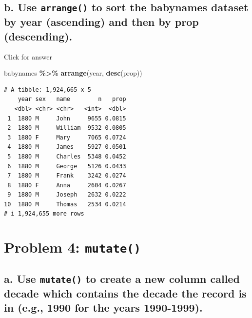 \documentclass[
]{book}
\newenvironment{Shaded}{\begin{snugshade}}{\end{snugshade}}
\newcommand{\FunctionTok}[1]{\textcolor[rgb]{0.13,0.29,0.53}{\textbf{#1}}}
\newcommand{\NormalTok}[1]{#1}
\newcommand{\SpecialCharTok}[1]{\textcolor[rgb]{0.81,0.36,0.00}{\textbf{#1}}}
\begin{document}
\hypertarget{b.-use-arrange-to-sort-the-babynames-dataset-by-year-ascending-and-then-by-prop-descending.}{%
\subsection{\texorpdfstring{b. Use \texttt{arrange()} to sort the babynames dataset by year (ascending) and then by prop (descending).}{b. Use arrange() to sort the babynames dataset by year (ascending) and then by prop (descending).}}\label{b.-use-arrange-to-sort-the-babynames-dataset-by-year-ascending-and-then-by-prop-descending.}}

Click for answer

\begin{Shaded}
\begin{Highlighting}[]
\NormalTok{babynames }\SpecialCharTok{\%\textgreater{}\%} \FunctionTok{arrange}\NormalTok{(year, }\FunctionTok{desc}\NormalTok{(prop))}
\end{Highlighting}
\end{Shaded}

\begin{verbatim}
# A tibble: 1,924,665 x 5
    year sex   name        n   prop
   <dbl> <chr> <chr>   <int>  <dbl>
 1  1880 M     John     9655 0.0815
 2  1880 M     William  9532 0.0805
 3  1880 F     Mary     7065 0.0724
 4  1880 M     James    5927 0.0501
 5  1880 M     Charles  5348 0.0452
 6  1880 M     George   5126 0.0433
 7  1880 M     Frank    3242 0.0274
 8  1880 F     Anna     2604 0.0267
 9  1880 M     Joseph   2632 0.0222
10  1880 M     Thomas   2534 0.0214
# i 1,924,655 more rows
\end{verbatim}

\hypertarget{problem-4-mutate}{%
\section{\texorpdfstring{Problem 4: \texttt{mutate()}}{Problem 4: mutate()}}\label{problem-4-mutate}}

\hypertarget{a.-use-mutate-to-create-a-new-column-called-decade-which-contains-the-decade-the-record-is-in-e.g.-1990-for-the-years-1990-1999.}{%
\subsection{\texorpdfstring{a. Use \texttt{mutate()} to create a new column called decade which contains the decade the record is in (e.g., 1990 for the years 1990-1999).}{a. Use mutate() to create a new column called decade which contains the decade the record is in (e.g., 1990 for the years 1990-1999).}}\label{a.-use-mutate-to-create-a-new-column-called-decade-which-contains-the-decade-the-record-is-in-e.g.-1990-for-the-years-1990-1999.}}
\end{document}
